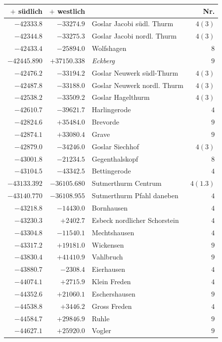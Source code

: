 \clearpage
\begin{center}\begingroup\fontsize{8}{9}\selectfont
\setlength{\tabcolsep}{4pt}
\begin{tabular}{r|r|p{170pt}|r}\hline
\(+\) südlich&\(+\) westlich&&Nr.\\\hline
\(-42333.8\)&\(-33274.9\)&Goslar Jacobi südl. Thurm&\(4 (3)\)\\
\(-42344.8\)&\(-33275.3\)&Goslar Jacobi nordl. Thurm&\(4 (3)\)\\
\(-42433.4\)&\(-25894.0\)&Wolfshagen&\(8\)\\
\(-42445.890\)&\(+37150.338\)&\textit{Eckberg}&\(9\)\\
\(-42476.2\)&\(-33194.2\)&Goslar Neuwerk südl-Thurm&\(4 (3)\)\\
\(-42487.8\)&\(-33188.0\)&Goslar Neuwerk nordl. Thurm&\(4 (3)\)\\
\(-42538.2\)&\(-33509.2\)&Goslar Hagelthurm&\(4 (3)\)\\
\(-42610.7\)&\(-39621.7\)&Harlingerode&\(4\)\\
\(-42824.6\)&\(+35484.0\)&Brevorde&\(9\)\\
\(-42874.1\)&\(+33080.4\)&Grave&\(9\)\\
\(-42879.0\)&\(-34246.0\)&Goslar Siechhof&\(4 (3)\)\\
\(-43001.8\)&\(-21234.5\)&Gegenthalskopf&\(8\)\\
\(-43104.5\)&\(-43342.5\)&Bettingerode&\(4\)\\
\(-43133.392\)&\(-36105.680\)&Sutmerthurm Centrum&\(4(1.3)\)\\
\(-43140.770\)&\(-36108.955\)&Sutmerthurm Pfahl daneben&\(4\)\\
\(-43218.8\)&\(-14430.0\)&Bornhausen&\(4\)\\
\(-43230.3\)&\(+2402.7\)&Esbeck nordlicher Schorstein&\(4\)\\
\(-43304.8\)&\(-11540.1\)&Mechtshausen&\(4\)\\
\(-43317.2\)&\(+19181.0\)&Wickensen&\(9\)\\
\(-43830.4\)&\(+41410.9\)&Vahlbruch&\(9\)\\
\(-43880.7\)&\(-2308.4\)&Eierhausen&\(4\)\\
\(-44074.1\)&\(+2715.9\)&Klein Freden&\(4\)\\
\(-44352.6\)&\(+21060.1\)&Eschershausen&\(9\)\\
\(-44538.8\)&\(+3446.2\)&Gross Freden&\(4\)\\
\(-44584.7\)&\(+29846.9\)&Ruhle&\(9\)\\
\(-44627.1\)&\(+25920.0\)&Vogler&\(9\)\\

\end{tabular}
\end{center}
